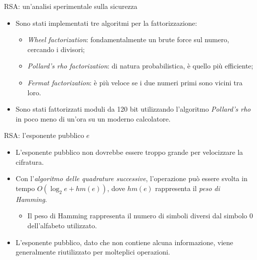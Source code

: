 \documentclass[11pt,svgnames,smaller,aspectratio=169,italian]{beamer}
\begin{document}
\begin{frame}{RSA: un'analisi sperimentale sulla sicurezza}
	\begin{itemize}
		\item Sono stati implementati tre algoritmi per la fattorizzazione:
			\begin{itemize}
				\item \emph{Wheel factorization}: fondamentalmente un brute force sul numero, cercando i divisori;
				\item \emph{Pollard's rho factorization}: di natura probabilistica, è quello più efficiente;
				\item \emph{Fermat factorization}: è più veloce se i due numeri primi sono vicini tra loro.
			\end{itemize}
		\item Sono stati fattorizzati moduli da 120 bit utilizzando l'algoritmo \emph{Pollard's rho} in poco meno di un'ora su un moderno calcolatore.
	\end{itemize}
\end{frame}

\begin{frame}{RSA: l'esponente pubblico $e$}
	\begin{itemize}
		\item L'esponente pubblico non dovrebbe essere troppo grande per velocizzare la cifratura.
		\item Con l'\emph{algoritmo delle quadrature successive}, l'operazione può essere svolta in tempo $O(\log_{2} e + hm(e))$, dove $hm(e)$ rappresenta il \emph{peso di Hamming}.
			\begin{itemize}
				\item Il peso di Hamming rappresenta il numero di simboli diversi dal simbolo $0$ dell'alfabeto utilizzato.
			\end{itemize}
		\item L'esponente pubblico, dato che non contiene alcuna informazione, viene generalmente riutilizzato per molteplici operazioni.
	\end{itemize}
\end{frame}
\end{document}
